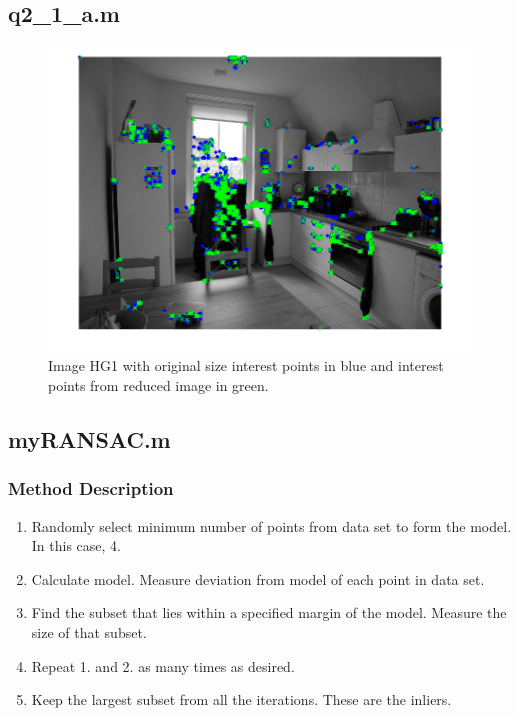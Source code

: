 \documentclass[a4paper, 10pt, conference]{ieeeconf}
\begin{document}

\newpage

\subsection*{q2\_1\_a.m}

\begin{figure}[!ht]
  \centering
  \includegraphics[width=\linewidth]{pic/q2_1_a_imgBoth}
  \caption{Image HG1 with original size interest points in blue and interest points from reduced image in green.}
\end{figure}


\newpage

\subsection*{myRANSAC.m}

\subsubsection{Method Description}
\begin{enumerate}
    \item Randomly select minimum number of points from data set to form the model. In this case, 4.
    \item Calculate model. Measure deviation from model of each point in data set.
    \item Find the subset that lies within a specified margin of the model. Measure the size of that subset.
    \item Repeat 1. and 2. as many times as desired.
    \item Keep the largest subset from all the iterations. These are the inliers.
\end{enumerate}
\end{document}
